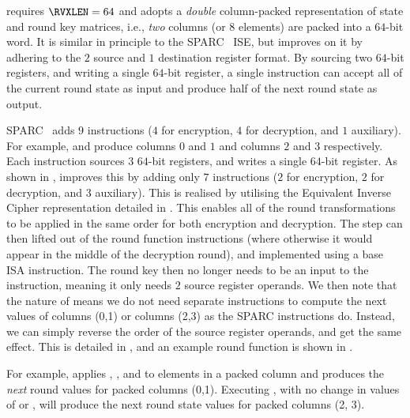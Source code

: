 
 requires $\RVXLEN = 64$
and adopts a {\em double} column-packed 
representation of state and round key matrices,
i.e., {\em two} columns (or $8$ elements) are packed into a $64$-bit word.
It is similar in principle to the SPARC~\cite[Page 109]{SPARC:16} ISE,
but improves on it by adhering to the
$2$ source and $1$ destination register format.
By sourcing two $64$-bit registers, and writing a single $64$-bit register,
a single instruction can 
accept  all  of the current round state as  input
and
produce half of the next    round state as output.

SPARC~\cite[Page 109]{SPARC:16} adds $ 9$
instructions ($4$ for encryption, $4$ for decryption, and $1$ auxiliary).
For example,  and 
produce columns $0$ and $1$ and columns $2$ and $3$
respectively.
Each instruction sources $3$ $64$-bit registers, and writes a single
$64$-bit register.
As shown in ,  improves this by 
adding only $ 7$
instructions ($2$ for encryption, $2$ for decryption, and $3$ auxiliary).
This is realised by utilising the Equivalent Inverse Cipher representation
detailed in \cite[Section 5.3.5]{FIPS:197}.
This enables all of the round transformations to be applied in the same
order for both encryption and decryption.
The  step can then lifted out of the
round function instructions (where otherwise it would appear in the middle of
the decryption round), and implemented using a base ISA 
instruction.
The round key then no longer needs to be an input to the instruction,
meaning it only needs $2$ source register operands.
We then note that the nature of  means we do
not need separate instructions to compute the next values of
columns (0,1) or columns (2,3) as the SPARC instructions do.
Instead, we can simply reverse the order of the source register
operands, and get the same effect.
This is detailed in , and an example round
function is shown in .

For example,
applies
, , and   
to elements in a packed column and
produces the {\em next} round values for packed columns (0,1).
Executing
, with no change in values of
 or , will produce the next round state values for
packed columns (2, 3).

